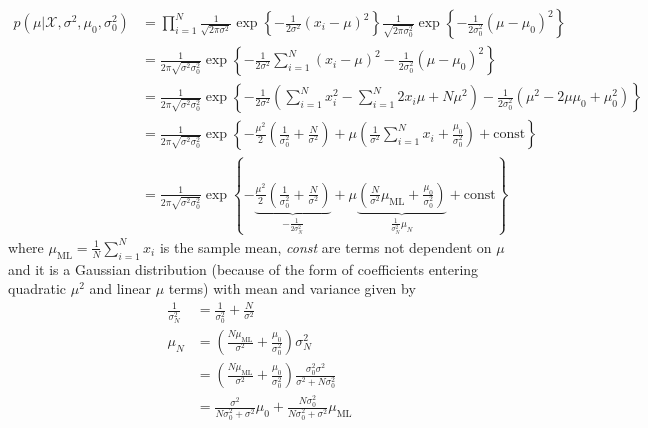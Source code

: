 \documentclass{amsmlaj}
\begin{document}
\begin{problem}
\begin{enumerate}
	\begin{equation}
		\begin{split}
		p(\mu|\mathcal{X},\sigma^2, \mu_0,\sigma_0^2)
		&=\prod_{i=1}^{N}\frac{1}{\sqrt{2\pi\sigma^2}}\exp\left\{ -\frac{1}{2\sigma^2}(x_i-\mu)^2
		\right\} \frac{1}{\sqrt{2\pi\sigma_0^2}}\exp\left\{
		-\frac{1}{2\sigma_0^2}(\mu-\mu_0)^2 \right\} \\
		&=\frac{1}{2\pi\sqrt{\sigma^2\sigma_0^2}}\exp\left\{
			-\frac{1}{2\sigma^2}\sum_{i=1}^N (x_i-\mu)^2
			-\frac{1}{2\sigma_0^2}(\mu-\mu_0)^2
		\right\} \\
		&=\frac{1}{2\pi\sqrt{\sigma^2\sigma_0^2}}\exp\left\{
			-\frac{1}{2\sigma^2}\left(
			\sum_{i=1}^N x_i^2 - \sum_{i=1}^N 2x_i\mu + N\mu^2
			\right) -
			\frac{1}{2\sigma_0^2} (\mu^2 - 2\mu\mu_0 + \mu_0^2)
		\right\} \\
		&=\frac{1}{2\pi\sqrt{\sigma^2\sigma_0^2}}\exp\left\{ 
			-\frac{\mu^2}{2}\left( \frac{1}{\sigma_0^2}+\frac{N}{\sigma^2} \right)
			+
			\mu\left( 
			\frac{1}{\sigma^2}\sum_{i=1}^N x_i +
			\frac{\mu_0}{\sigma_0^2}
			\right) + \text{const}
		\right\} \\
		&=\frac{1}{2\pi\sqrt{\sigma^2\sigma_0^2}}\exp\left\{ 
			-\underbrace{\frac{\mu^2}{2}\left(
				\frac{1}{\sigma_0^2}+\frac{N}{\sigma^2}
			\right)}_{-\frac{1}{2\sigma_N^2}}
			+
			\mu\underbrace{\left( 
			\frac{N}{\sigma^2} \mu_\text{ML} +
			\frac{\mu_0}{\sigma_0^2}
			\right)}_{\frac{1}{\sigma_N^2}\mu_N} + \text{const}
		\right\}
		\end{split}
	\end{equation}
	where $\mu_\text{ML}=\frac{1}{N}\sum_{i=1}^N x_i$ is the sample mean, \textit{const} are terms
	not dependent on $\mu$ and it is a Gaussian
	distribution (because of the form of coefficients entering quadratic $\mu^2$
	and linear $\mu$ terms) with mean and variance given by
	\begin{equation}
		\begin{split}
			\frac{1}{\sigma_N^2}&=\frac{1}{\sigma_0^2}+\frac{N}{\sigma^2} \\
			\mu_N&=\left(
					\frac{N\mu_\text{ML}}{\sigma^2}+\frac{\mu_0}{\sigma_0^2}
				\right)\sigma_N^2 \\
				&=\left(
				\frac{N\mu_\text{ML}}{\sigma^2}+\frac{\mu_0}{\sigma_0^2}
				\right)\frac{\sigma_0^2\sigma^2}{\sigma^2+N\sigma_0^2} \\
				&=\frac{\sigma^2}{N\sigma_0^2+\sigma^2}\mu_0  +
					\frac{N\sigma_0^2}{N\sigma_0^2+\sigma^2}\mu_\text{ML}
		\end{split}
	\end{equation}


\end{enumerate}
\end{problem}
\end{document}
